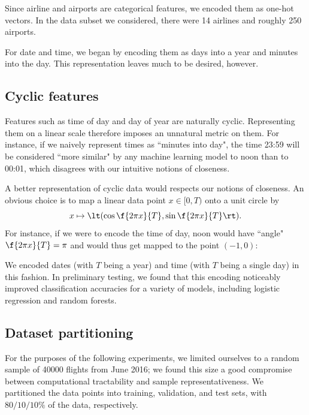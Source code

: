 \documentclass{article}
\begin{document}
\begin{multicols}{2}
Since airline and airports are categorical features,
we encoded them as one-hot vectors.
In the data subset we considered,
there were 14 airlines and roughly 250 airports.

For date and time,
we began by encoding them as days into a year
and minutes into the day.
This representation leaves much to be desired, however.


\subsection{Cyclic features}

Features such as time of day and day of year
are naturally cyclic.
Representing them on a linear scale
therefore imposes an unnatural metric on them.
For instance,
if we naively represent times as ``minutes into day",
the time 23:59 will be considered ``more similar"
by any machine learning model to noon than to 00:01,
which disagrees with our intuitive notions of closeness.

A better representation of cyclic data
would respects our notions of closeness.
An obvious choice is to map a linear data point $x \in [0, T)$
onto a unit circle by
\begin{equation}
    \label{eq:cyc-mapping}
    x \mapsto \lt(\cos\f{2\pi x}{T}, \sin\f{2\pi x}{T}\rt).
\end{equation}
For instance, if we were to encode the time of day,
noon would have ``angle" $\f{2\pi x}{T} = \pi$
and would thus get mapped to the point $(-1, 0)$:

\begin{center}
    
\end{center}

We encoded dates (with $T$ being a year)
and time (with $T$ being a single day)
in this fashion.
In preliminary testing,
we found that this encoding
noticeably improved classification accuracies
for a variety of models,
including logistic regression and random forests.

\subsection{Dataset partitioning}

For the purposes of the following experiments,
we limited ourselves to a random sample of 40000 flights
from June 2016;
we found this size a good compromise between computational tractability
and sample representativeness.
We partitioned the data points into training, validation, and test sets,
with $80/10/10\%$ of the data, respectively.



\end{multicols}
\end{document}

